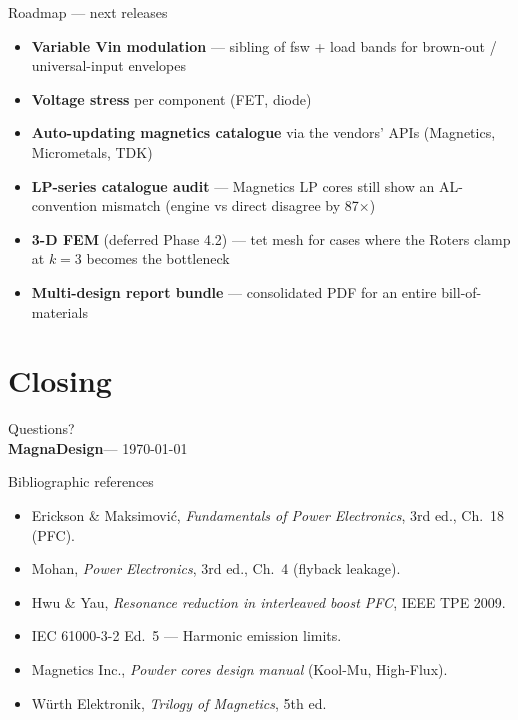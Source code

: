 \documentclass[11pt, aspectratio=169]{beamer}
\newenvironment{standoutpage}{%
  \begin{frame}[plain, noframenumbering]%
  \centering\vfill\Huge\bfseries\color{md-violet-dark}%
}{%
  \vfill\end{frame}%
}
\newcommand{\app}{\textbf{MagnaDesign}\xspace}
\begin{document}
\begin{frame}{Roadmap --- next releases}
  \begin{itemize}
    \item \textbf{Variable Vin modulation} --- sibling of
          fsw + load bands for brown-out / universal-input
          envelopes
    \item \textbf{Voltage stress} per component (FET, diode)
    \item \textbf{Auto-updating magnetics catalogue} via the
          vendors' APIs (Magnetics, Micrometals, TDK)
    \item \textbf{LP-series catalogue audit} ---
          Magnetics LP cores still show an AL-convention
          mismatch (engine vs direct disagree by 87$\times$)
    \item \textbf{3-D FEM} (deferred Phase 4.2) --- tet
          mesh for cases where the Roters clamp at $k=3$
          becomes the bottleneck
    \item \textbf{Multi-design report bundle} ---
          consolidated PDF for an entire bill-of-materials
  \end{itemize}
\end{frame}

\section*{Closing}

\begin{standoutpage}
  Questions?
  \\\medskip
  {\large\mdseries\color{md-muted}\app --- \today}
\end{standoutpage}

\begin{frame}{Bibliographic references}
  \footnotesize
  \begin{itemize}
    \item Erickson \& Maksimovi\'{c}, \emph{Fundamentals of
          Power Electronics}, 3rd ed., Ch.~18 (PFC).
    \item Mohan, \emph{Power Electronics}, 3rd ed., Ch.~4
          (flyback leakage).
    \item Hwu \& Yau, \emph{Resonance reduction in interleaved
          boost PFC}, IEEE TPE 2009.
    \item IEC 61000-3-2 Ed.~5 --- Harmonic emission limits.
    \item Magnetics Inc., \emph{Powder cores design manual}
          (Kool-Mu, High-Flux).
    \item Würth Elektronik, \emph{Trilogy of Magnetics},
          5th ed.
  \end{itemize}
\end{frame}
\end{document}
